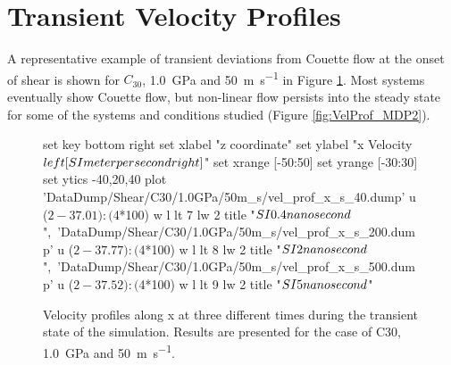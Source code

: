 \documentclass[5p]{elsarticle}
\begin{document}
\section{Transient Velocity Profiles}

A representative example of transient deviations from Couette flow at the onset of shear is shown for $C_{30}$, \SI{1.0}{\giga\pascal} and  \SI{50}{\meter\per\second} in Figure \ref{fig:VelProf_MDP}. Most systems eventually show Couette flow, but non-linear flow persists into the steady state for some of the systems and conditions studied (Figure \ref{fig:VelProf_MDP2}).

\begin{figure}[htp]
    	\begin{center}
		\begin{gnuplot}[terminal=epslatex, terminaloptions={size \SERFigwidth cm, \SERFigheight cm color solid}]

			set key bottom right
			set xlabel "z coordinate"  
			set ylabel "x Velocity $\\left[ \\SI{}{\\meter\\per\\second} \\right]$"
			set xrange [-50:50]
			set yrange [-30:30]
			set ytics -40,20,40
			plot  	'DataDump/Shear/C30/1.0GPa/50m_s/vel_prof_x_s_40.dump' u ($2-37.01):($4*100) w l  lt 7 lw 2  title               "$\\SI{0.4}{\\nano\\second}$",\
					'DataDump/Shear/C30/1.0GPa/50m_s/vel_prof_x_s_200.dump' u ($2-37.77):($4*100) w l  lt 8 lw 2  title     "$\\SI{2}{\\nano\\second}$",\
					'DataDump/Shear/C30/1.0GPa/50m_s/vel_prof_x_s_500.dump' u ($2-37.52):($4*100) w l  lt 9 lw 2  title     "$\\SI{5}{\\nano\\second}$"
					
		\end{gnuplot}
		\caption{Velocity profiles along x at three different times during the transient state of the simulation. Results are presented for the case of  C30,  \SI{1.0}{\giga\pascal} and  \SI{50}{\meter\per\second}.}
		\label{fig:VelProf_MDP}
	\end{center}
 \end{figure}
\end{document}
